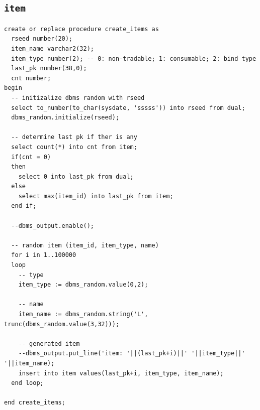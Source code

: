 \documentclass[11pt]{article}
\begin{document}
\subsection{\texttt{item}}
\label{sec:org1818239}
\begin{verbatim}
create or replace procedure create_items as
  rseed number(20);
  item_name varchar2(32);
  item_type number(2); -- 0: non-tradable; 1: consumable; 2: bind type
  last_pk number(38,0);
  cnt number;
begin
  -- initizalize dbms random with rseed
  select to_number(to_char(sysdate, 'sssss')) into rseed from dual;
  dbms_random.initialize(rseed);

  -- determine last pk if ther is any
  select count(*) into cnt from item;
  if(cnt = 0)
  then
    select 0 into last_pk from dual;
  else
    select max(item_id) into last_pk from item;
  end if;

  --dbms_output.enable();

  -- random item (item_id, item_type, name)
  for i in 1..100000
  loop
    -- type
    item_type := dbms_random.value(0,2);

    -- name
    item_name := dbms_random.string('L', trunc(dbms_random.value(3,32)));

    -- generated item
    --dbms_output.put_line('item: '||(last_pk+i)||' '||item_type||' '||item_name);
    insert into item values(last_pk+i, item_type, item_name);
  end loop;

end create_items;
\end{verbatim}
\end{document}
